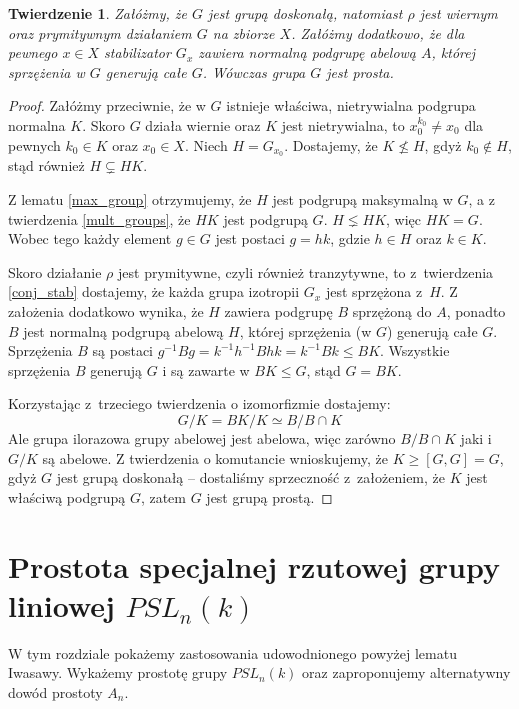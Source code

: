 \documentclass[licencjacka]{pracamgr}
\newtheorem{thh}{Twierdzenie}[section]
\begin{document}
\begin{thh}
    Załóżmy, że $G$ jest grupą doskonałą, natomiast $\rho$ jest wiernym oraz prymitywnym działaniem $G$ na zbiorze $X$.
    Załóżmy dodatkowo, że dla pewnego $x \in X$ stabilizator $G_x$ zawiera normalną podgrupę abelową $A$,
    której sprzężenia w $G$ generują całe $G$.
    Wówczas grupa $G$ jest prosta.
\end{thh}
\begin{proof}
    Załóżmy przeciwnie, że w $G$ istnieje właściwa, nietrywialna podgrupa normalna $K$.
    Skoro $G$ działa wiernie oraz $K$ jest nietrywialna, to $x_0^{k_0} \ne x_0$ dla pewnych $k_0 \in K$ oraz $x_0 \in X$.
    Niech $H = G_{x_0}$.
    Dostajemy, że $K \nleq H$, gdyż $k_0 \not \in H$, stąd również $H \subsetneq H K$.

    Z lematu \ref{max_group} otrzymujemy, że $H$ jest podgrupą maksymalną w $G$,
    a z twierdzenia \ref{mult_groups}, że $H K$ jest podgrupą $G$.
    $H \lneq H K$, więc $H K = G$.
    Wobec tego każdy element $g \in G$ jest postaci $g = h k$, gdzie $h \in H$ oraz $k \in K$.

    Skoro działanie $\rho$ jest prymitywne, czyli również tranzytywne, to z~twierdzenia \ref{conj_stab}
    dostajemy, że każda grupa izotropii $G_x$ jest sprzężona z~$H$.
    Z założenia dodatkowo wynika, że $H$ zawiera podgrupę $B$ sprzężoną do $A$,
    ponadto $B$ jest normalną podgrupą abelową $H$, której sprzężenia (w $G$) generują całe $G$.
    Sprzężenia $B$ są postaci $g^{-1} B g = k^{-1} h^{-1} B h k = k^{-1} B k \le B K$.
    Wszystkie sprzężenia $B$ generują $G$ i są zawarte w $B K \le G$, stąd $G = B K$.

    Korzystając z~trzeciego twierdzenia o izomorfizmie dostajemy:
    $$ G/K = BK/K \simeq B/B\cap K$$
    Ale grupa ilorazowa grupy abelowej jest abelowa, więc zarówno $B/B\cap K$ jaki i $G/K$ są abelowe.
    Z twierdzenia o komutancie wnioskujemy, że $K \ge [G, G] = G$, gdyż $G$ jest grupą doskonałą --
    dostaliśmy sprzeczność z~założeniem, że $K$ jest właściwą podgrupą $G$, zatem $G$ jest grupą prostą.
\end{proof}



\chapter{Prostota specjalnej rzutowej grupy liniowej $PSL_n(k)$}

W tym rozdziale pokażemy zastosowania udowodnionego powyżej lematu Iwasawy.
Wykażemy prostotę grupy $PSL_n(k)$ oraz zaproponujemy alternatywny dowód prostoty $A_n$.
\end{document}
